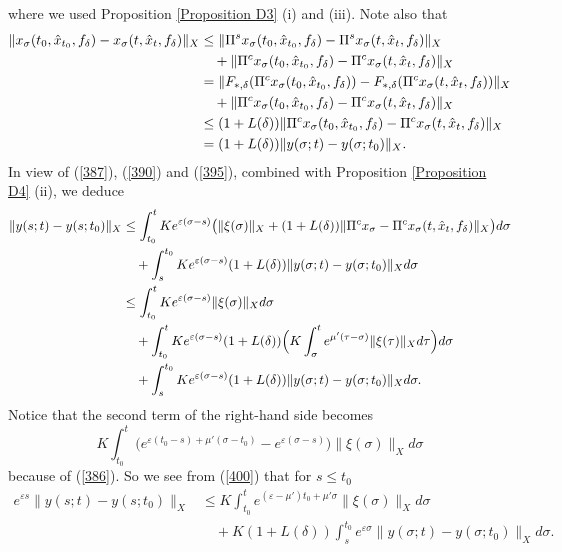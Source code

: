 \documentclass[12pt]{amsart}
\begin{document}
where we used Proposition \ref{Proposition D3} (i) and (iii). 
Note also that
\begin{align}\label{395}
   \|x_\sigma(t_0,\hat x_{t_0},f_\delta)-x_\sigma(t,\hat x_t,f_\delta)\|_X 
   &\leq \|\Pi^s x_\sigma(t_0,\hat x_{t_0},f_\delta)- \Pi^s x_\sigma(t,\hat x_t,f_\delta)\|_X  \notag \\
   &\quad +\|\Pi^c x_\sigma(t_0,\hat x_{t_0},f_\delta)- \Pi^c x_\sigma(t,\hat x_t,f_\delta)\|_X  \notag \\
   &= \| F_{\ast,\delta} (\Pi^c x_\sigma(t_0,\hat x_{t_0},f_\delta))
      - F_{\ast,\delta}(\Pi^cx_\sigma(t,\hat x_{t},f_\delta))\|_X  \notag \\
   &\quad +\|\Pi^c x_\sigma(t_0,\hat x_{t_0},f_\delta)- \Pi^c x_\sigma(t,\hat x_t,f_\delta)\|_X  \notag \\
   &\leq (1+L(\delta)) \|\Pi^c x_\sigma(t_0,\hat x_{t_0},f_\delta)- \Pi^c x_\sigma(t,\hat x_t,f_\delta)\|_X  \notag \\
   &= (1+L(\delta))\|y(\sigma ;t)-y(\sigma ;t_0)\|_X. 
\end{align}
In view of (\ref{387}), (\ref{390}) and (\ref{395}), combined with Proposition \ref{Proposition D4} (ii), we deduce
{\allowdisplaybreaks
\begin{align}\label{400} 
   \|y(s;t)-y(s;t_0)\|_X 
   &\leq \int_{t_0}^t K e^{\varepsilon (\sigma-s)} 
          \big( \|\xi(\sigma)\|_X+ (1+L(\delta))  \|\Pi^c x_\sigma- \Pi^c x_\sigma(t,\hat x_t,f_\delta)\|_X\big)d\sigma  \notag \\
   &\quad +\int_s^{t_0} K e^{\varepsilon (\sigma-s)} 
          (1+L(\delta)) \|y(\sigma ;t)-y(\sigma ;t_0)\|_X d\sigma  \notag \\
   &\leq  \int_{t_0}^t K e^{\varepsilon (\sigma-s)}  \|\xi(\sigma)\|_X d\sigma  \notag \\
   &\quad +\int_{t_0}^t K e^{\varepsilon (\sigma-s)} 
          (1+L(\delta))\Big( K \int_\sigma^t e^{\mu'(\tau-\sigma)}\|\xi(\tau)\|_Xd\tau \Big)d\sigma  \notag \\
   &\quad +\int_s^{t_0} K e^{\varepsilon (\sigma-s)} 
          (1+L(\delta)) \|y(\sigma ;t)-y(\sigma ;t_0)\|_X d\sigma. 
\end{align}}Notice that the second term of the right-hand side becomes 
$$
  K\int_{t_0}^t \big(e^{\varepsilon(t_0-s)+\mu'(\sigma-t_0)}-e^{\varepsilon (\sigma-s)} \big)\|\xi(\sigma)\|_Xd\sigma  
$$
because of (\ref{386}). So we see from (\ref{400}) that for $s\leq t_0$ 
\begin{align*}
   e^{\varepsilon s}\|y(s;t)-y(s;t_0)\|_X 
   &\leq K\int_{t_0}^t e^{(\varepsilon-\mu')t_0+\mu'\sigma}\|\xi(\sigma)\|_Xd\sigma  \\
   &\quad +K(1+L(\delta)) \int_s^{t_0} e^{\varepsilon \sigma} \|y(\sigma ;t)-y(\sigma ;t_0)\|_X d\sigma. 
\end{align*}
\end{document}
